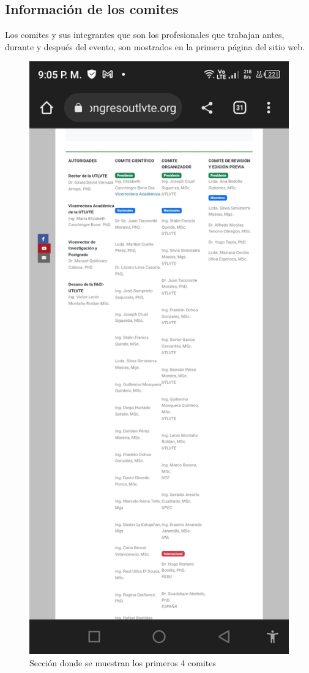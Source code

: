 \documentclass[a4paper,14px]{article}
\begin{document}
\newpage
\subsection{Información de los comites }

Los comites y sus integrantes que son los profesionales que trabajan antes, durante y después del evento, son mostrados en la primera página del sitio web. \\




\begin{minipage}[H]{0.45\linewidth}
  \begin{figure}[H]
    \centering
    \includegraphics[scale=0.25]{comite1.jpg}
    \caption{Sección donde se muestran los primeros 4 comites}
    \label{fig:comite1}
  \end{figure}
\end{minipage}
\end{document}

